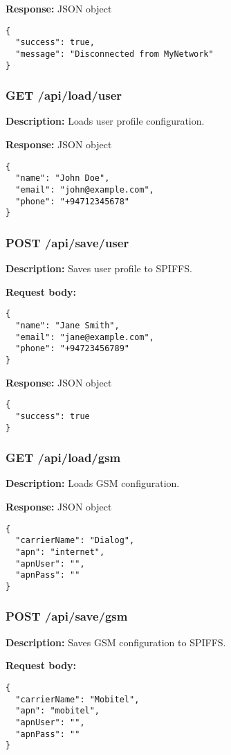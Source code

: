 \documentclass[11pt,a4paper]{article}
\begin{document}
\textbf{Response:} JSON object
\begin{verbatim}
{
  "success": true,
  "message": "Disconnected from MyNetwork"
}
\end{verbatim}

\subsubsection{GET /api/load/user}
\textbf{Description:} Loads user profile configuration.

\textbf{Response:} JSON object
\begin{verbatim}
{
  "name": "John Doe",
  "email": "john@example.com",
  "phone": "+94712345678"
}
\end{verbatim}

\subsubsection{POST /api/save/user}
\textbf{Description:} Saves user profile to SPIFFS.

\textbf{Request body:}
\begin{verbatim}
{
  "name": "Jane Smith",
  "email": "jane@example.com",
  "phone": "+94723456789"
}
\end{verbatim}

\textbf{Response:} JSON object
\begin{verbatim}
{
  "success": true
}
\end{verbatim}

\subsubsection{GET /api/load/gsm}
\textbf{Description:} Loads GSM configuration.

\textbf{Response:} JSON object
\begin{verbatim}
{
  "carrierName": "Dialog",
  "apn": "internet",
  "apnUser": "",
  "apnPass": ""
}
\end{verbatim}

\subsubsection{POST /api/save/gsm}
\textbf{Description:} Saves GSM configuration to SPIFFS.

\textbf{Request body:}
\begin{verbatim}
{
  "carrierName": "Mobitel",
  "apn": "mobitel",
  "apnUser": "",
  "apnPass": ""
}
\end{verbatim}
\end{document}
